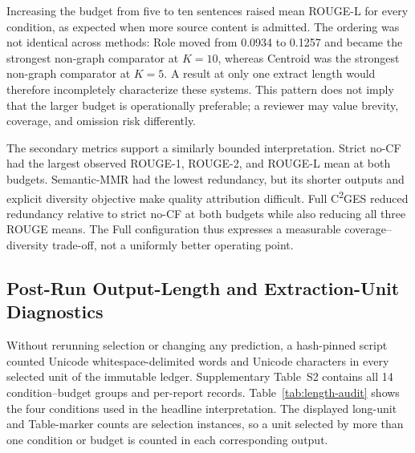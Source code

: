 \documentclass[applsci,article,submit,moreauthors]{Definitions/mdpi}
\newcommand{\cges}{C\textsuperscript{2}GES}
\begin{document}
Increasing the budget from five to ten sentences raised mean ROUGE-L for every condition, as expected when more source content is admitted. The ordering was not identical across methods: Role moved from 0.0934 to 0.1257 and became the strongest non-graph comparator at $K=10$, whereas Centroid was the strongest non-graph comparator at $K=5$. A result at only one extract length would therefore incompletely characterize these systems. This pattern does not imply that the larger budget is operationally preferable; a reviewer may value brevity, coverage, and omission risk differently.

The secondary metrics support a similarly bounded interpretation. Strict no-CF had the largest observed ROUGE-1, ROUGE-2, and ROUGE-L mean at both budgets. Semantic-MMR had the lowest redundancy, but its shorter outputs and explicit diversity objective make quality attribution difficult. Full \cges{} reduced redundancy relative to strict no-CF at both budgets while also reducing all three ROUGE means. The Full configuration thus expresses a measurable coverage--diversity trade-off, not a uniformly better operating point.

\subsection{Post-Run Output-Length and Extraction-Unit Diagnostics}

Without rerunning selection or changing any prediction, a hash-pinned script counted Unicode whitespace-delimited words and Unicode characters in every selected unit of the immutable ledger. Supplementary Table~S2 contains all 14 condition--budget groups and per-report records. Table~\ref{tab:length-audit} shows the four conditions used in the headline interpretation. The displayed long-unit and Table-marker counts are selection instances, so a unit selected by more than one condition or budget is counted in each corresponding output.
\end{document}
